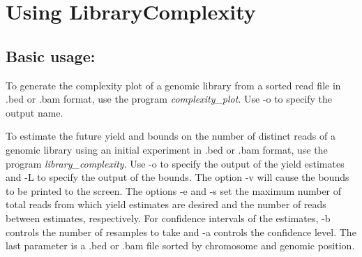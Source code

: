 \documentclass[11pt]{report}
\begin{document}
\section{Using LibraryComplexity}
\label{sec:usage}

\subsection*{Basic usage:}

To generate the complexity plot of a genomic
library from a sorted read file in .bed or .bam format,
use the program \textit{complexity\_plot}.  Use
-o to specify the output name.

To estimate the future yield 
and bounds on the number of distinct reads
of a genomic library
using an initial experiment in .bed or .bam format,
use the program \textit{library\_complexity}.
Use -o to specify the output of the yield
estimates and -L to specify the output of
the bounds.  The option -v will cause the bounds
to be printed to the screen.  The options
-e and -s set the maximum number of 
total reads from which yield estimates are desired
and the number of reads between estimates, respectively.
For confidence intervals of the estimates, -b controls
the number of resamples to take and -a controls the confidence
level.  The last parameter is a .bed or .bam
file sorted by chromosome and genomic position.
\end{document}
